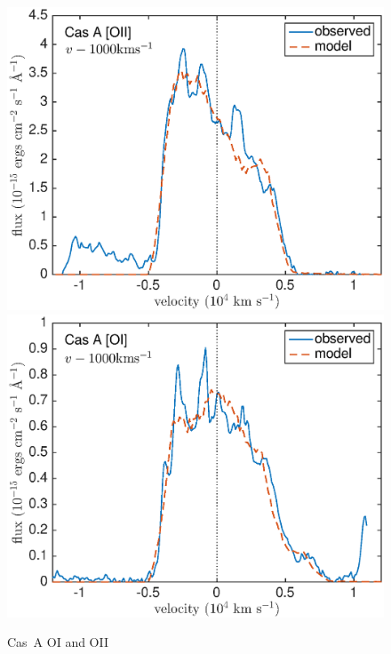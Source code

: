 \begin{figure}
\centering
\includegraphics[scale=0.41,clip=true, trim=15 0 40 20]{chapters/chapter6/figs/CasA/CasA_shifted1000_OII}
\includegraphics[scale=0.41,clip=true, trim=15 0 40 20]{chapters/chapter6/figs/CasA/CasA_OI_shifted1000}
\caption{Cas~A OI and OII}
\label{CasA_OI_OII}
\end{figure}


